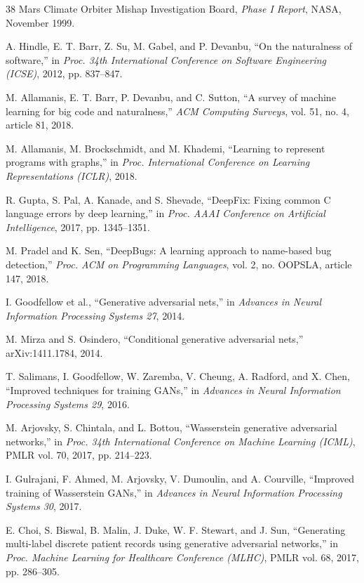 \documentclass[conference]{IEEEtran}
\begin{document}
\begin{thebibliography}{38}
Mars Climate Orbiter Mishap Investigation Board,
\textit{Phase I Report},
NASA, November 1999.

A. Hindle, E. T. Barr, Z. Su, M. Gabel, and P. Devanbu,
``On the naturalness of software,''
in \textit{Proc. 34th International Conference on Software Engineering (ICSE)}, 2012, pp. 837--847.

M. Allamanis, E. T. Barr, P. Devanbu, and C. Sutton,
``A survey of machine learning for big code and naturalness,''
\textit{ACM Computing Surveys}, vol. 51, no. 4, article 81, 2018.

M. Allamanis, M. Brockschmidt, and M. Khademi,
``Learning to represent programs with graphs,''
in \textit{Proc. International Conference on Learning Representations (ICLR)}, 2018.

R. Gupta, S. Pal, A. Kanade, and S. Shevade,
``DeepFix: Fixing common C language errors by deep learning,''
in \textit{Proc. AAAI Conference on Artificial Intelligence}, 2017, pp. 1345--1351.

M. Pradel and K. Sen,
``DeepBugs: A learning approach to name-based bug detection,''
\textit{Proc. ACM on Programming Languages}, vol. 2, no. OOPSLA, article 147, 2018.

I. Goodfellow et al.,
``Generative adversarial nets,''
in \textit{Advances in Neural Information Processing Systems 27}, 2014.

M. Mirza and S. Osindero,
``Conditional generative adversarial nets,''
arXiv:1411.1784, 2014.

T. Salimans, I. Goodfellow, W. Zaremba, V. Cheung, A. Radford, and X. Chen,
``Improved techniques for training GANs,''
in \textit{Advances in Neural Information Processing Systems 29}, 2016.

M. Arjovsky, S. Chintala, and L. Bottou,
``Wasserstein generative adversarial networks,''
in \textit{Proc. 34th International Conference on Machine Learning (ICML)}, PMLR vol. 70, 2017, pp. 214--223.

I. Gulrajani, F. Ahmed, M. Arjovsky, V. Dumoulin, and A. Courville,
``Improved training of Wasserstein GANs,''
in \textit{Advances in Neural Information Processing Systems 30}, 2017.

E. Choi, S. Biswal, B. Malin, J. Duke, W. F. Stewart, and J. Sun,
``Generating multi-label discrete patient records using generative adversarial networks,''
in \textit{Proc. Machine Learning for Healthcare Conference (MLHC)}, PMLR vol. 68, 2017, pp. 286--305.


\end{thebibliography}
\end{document}
